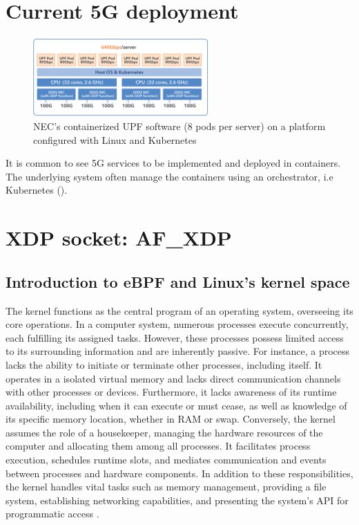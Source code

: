 \section{Current 5G deployment}
\begin{figure}[H]
    \centering
    \includegraphics[width=0.6\textwidth]{resources/images/640_nec_upf_system.PNG}
    \caption{NEC's containerized UPF software (8 pods per server) on a platform configured with Linux and Kubernetes \cite{nec_upf_whitepaper}}
    \label{fig:sota:640_nec_upf_system}
\end{figure}

It is common to see 5G services to be implemented and deployed in containers.
The underlying system often manage the containers using an orchestrator, i.e Kubernetes ().

\section{XDP socket: AF\_XDP}
\subsection{Introduction to eBPF and Linux's kernel space}
The kernel functions as the central program of an operating system, overseeing its core operations. 
In a computer system, numerous processes execute concurrently, each fulfilling its assigned tasks. 
However, these processes possess limited access to its surrounding information and are inherently passive.
For instance, a process lacks the ability to initiate or terminate other processes, including itself. 
It operates in a isolated virtual memory and lacks direct communication channels with other processes or devices. 
Furthermore, it lacks awareness of its runtime availability, including when it can execute or must cease, as well as knowledge of its specific memory location, whether in RAM or swap.
Conversely, the kernel assumes the role of a housekeeper, managing the hardware resources of the computer and allocating them among all processes. It facilitates process execution, schedules runtime slots, and mediates communication and events between processes and hardware components.
In addition to these responsibilities, the kernel handles vital tasks such as memory management, providing a file system, establishing networking capabilities, and presenting the system's \ac{API} for programmatic access \cite{kerrisk_linux_2010}.
\\


